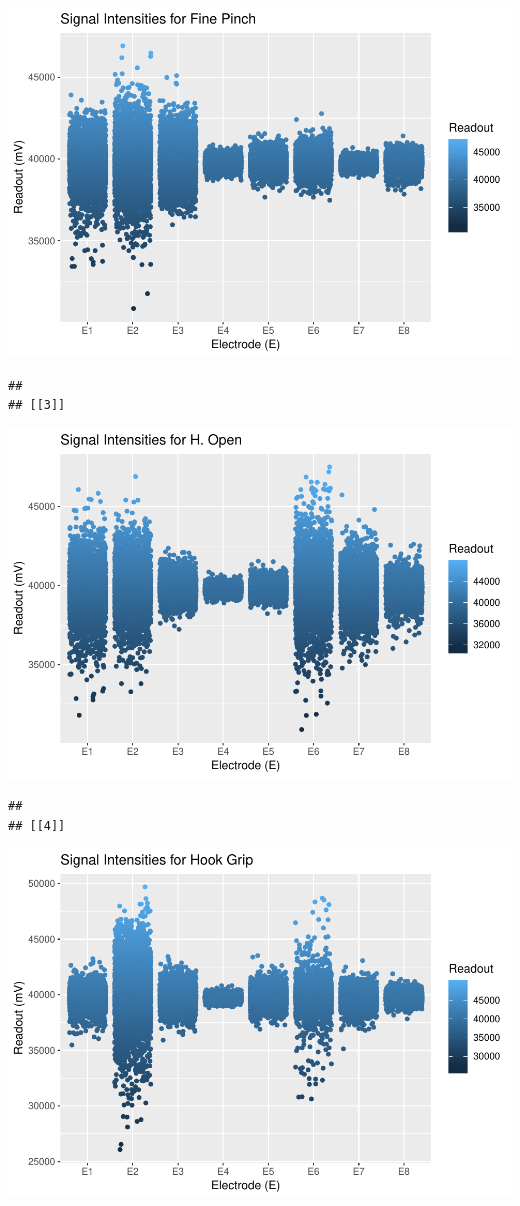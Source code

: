 \documentclass[]{article}
\begin{document}
\includegraphics{Megahand_files/figure-latex/unnamed-chunk-6-2.pdf}

\begin{verbatim}
## 
## [[3]]
\end{verbatim}

\includegraphics{Megahand_files/figure-latex/unnamed-chunk-6-3.pdf}

\begin{verbatim}
## 
## [[4]]
\end{verbatim}

\includegraphics{Megahand_files/figure-latex/unnamed-chunk-6-4.pdf}
\end{document}
